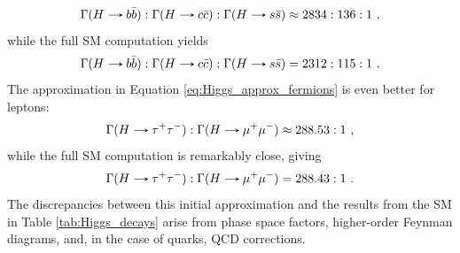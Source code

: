 \begin{equation*}
    \Gamma(H\decaysto b\bar{b}):\Gamma(H\decaysto c\bar{c}):\Gamma(H\decaysto s\bar{s}) \approx  2834:136:1\ ,
\end{equation*}
while the full SM computation yields
\begin{equation*}
    \Gamma(H\decaysto b\bar{b}):\Gamma(H\decaysto c\bar{c}):\Gamma(H\decaysto s\bar{s}) =  2312:115:1\ .
\end{equation*}
The approximation in Equation \eqref{eq:Higgs_approx_fermions} is even better for leptons:
\begin{equation*}
    \Gamma(H\decaysto \tau^+\tau^-):\Gamma(H\decaysto \mu^+\mu^-) \approx  288.53:1\ ,
\end{equation*}
while the full SM computation is remarkably close, giving
\begin{equation*}
    \Gamma(H\decaysto \tau^+\tau^-):\Gamma(H\decaysto \mu^+\mu^-) =  288.43:1\ .
\end{equation*}
The discrepancies between this initial approximation and the results from the SM in Table \ref{tab:Higgs_decays} arise from phase space factors, higher-order Feynman diagrams, and, in the case of quarks, QCD corrections.

